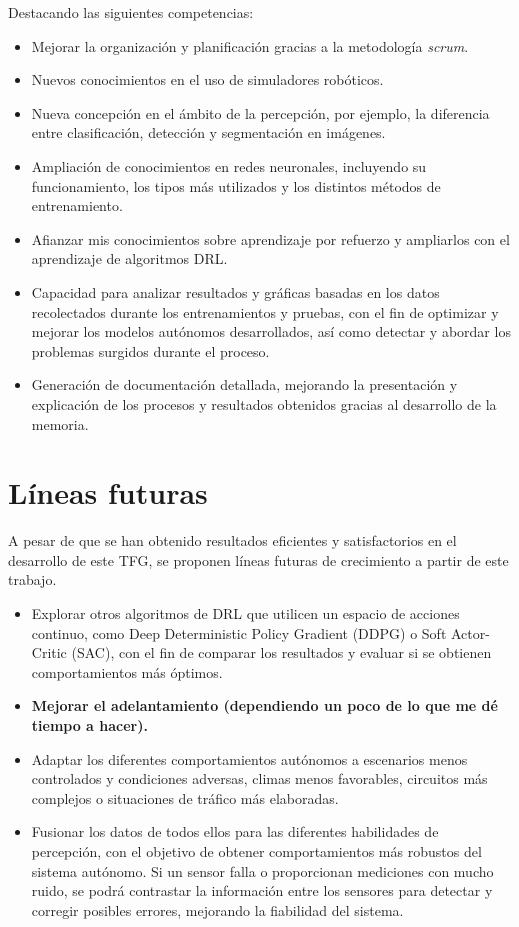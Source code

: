 Destacando las siguientes competencias:

\begin{itemize}
  \item Mejorar la organización y planificación gracias a la metodología \textit{scrum}.
  \item Nuevos conocimientos en el uso de simuladores robóticos.
  \item Nueva concepción en el ámbito de la percepción, por ejemplo, la diferencia entre clasificación, detección y segmentación en imágenes.
  \item Ampliación de conocimientos en redes neuronales, incluyendo su funcionamiento, los tipos más utilizados y los distintos métodos de entrenamiento.
  \item Afianzar mis conocimientos sobre aprendizaje por refuerzo y ampliarlos con el aprendizaje de algoritmos \ac{DRL}.
  \item Capacidad para analizar resultados y gráficas basadas en los datos recolectados durante los entrenamientos y pruebas, con el fin de optimizar y mejorar los modelos autónomos desarrollados, así como detectar y abordar los problemas surgidos durante el proceso.
  \item Generación de documentación detallada, mejorando la presentación y explicación de los procesos y resultados obtenidos gracias al desarrollo de la memoria.
\end{itemize}

\section{Líneas futuras}

A pesar de que se han obtenido resultados eficientes y satisfactorios en el desarrollo de este \ac{TFG}, se proponen líneas futuras de crecimiento a partir de este trabajo. 
\begin{itemize}
    \item Explorar otros algoritmos de \ac{DRL} que utilicen un espacio de acciones continuo, como Deep Deterministic Policy Gradient (DDPG) o Soft Actor-Critic (SAC), con el fin de comparar los resultados y evaluar si se obtienen comportamientos más óptimos.
    \item \textbf{Mejorar el adelantamiento (dependiendo un poco de lo que me dé tiempo a hacer).}
    \item Adaptar los diferentes comportamientos autónomos a escenarios menos controlados y condiciones adversas, climas menos favorables, circuitos más complejos o situaciones de tráfico más elaboradas.
	\item Fusionar los datos de todos ellos para las diferentes habilidades de percepción, con el objetivo de obtener comportamientos más robustos del sistema autónomo. Si un sensor falla o proporcionan mediciones con mucho ruido, se podrá contrastar la información entre los sensores para detectar y corregir posibles errores, mejorando la fiabilidad del sistema.
\end{itemize}
